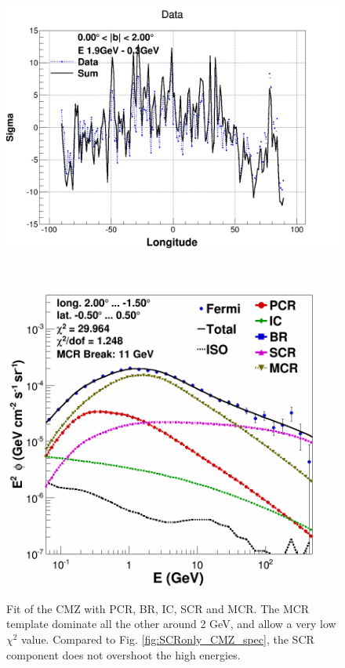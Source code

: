 \begin{figure}[h]
  \centering
  \begin{minipage}[h]{0.45\textwidth}
	  \centering
	  \includegraphics[width=\linewidth]{pic/results/MCRonly_weniger_sum_0-2.png}	  
  	  \subcaption{}
	  \label{fig:SCRonly_CMZ}
  \end{minipage}
  \hfill
  \begin{minipage}[h]{0.45\textwidth}
	  \centering
	  \includegraphics[width=\linewidth]{pic/results/MCRonly_CMZ.png}
	  \subcaption{}
  	  \label{fig:MCRonly_CMZ}
  \end{minipage}
  \caption{Fit of the CMZ with PCR, BR, IC, SCR and MCR. The MCR template dominate all the other around 2 GeV, and allow a very low $\chi^2$ value. Compared to Fig. \ref{fig:SCRonly_CMZ_spec}, the SCR component does not overshoot the high energies.}
  \label{fig:MCR_vs_SCRonly_CMZ}
\end{figure}

